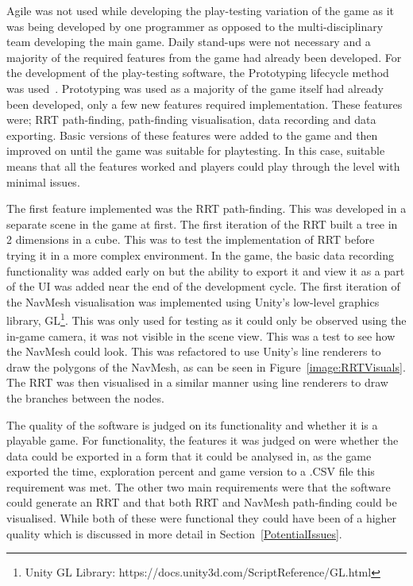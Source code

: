 \documentclass[journal]{IEEEtran}
\begin{document}
	Agile was not used while developing the play-testing variation of the game as it was being developed by one programmer as opposed to the multi-disciplinary team developing the main game. Daily stand-ups were not necessary and a majority of the required features from the game had already been developed. 
	For the development of the play-testing software, the Prototyping lifecycle method was used~\cite{isaias2015}. Prototyping was used as a majority of the game itself had already been developed, only a few new features required implementation. These features were; RRT path-finding, path-finding visualisation, data recording and data exporting. Basic versions of these features were added to the game and then improved on until the game was suitable for playtesting. In this case, suitable means that all the features worked and players could play through the level with minimal issues.  
	
	The first feature implemented was the RRT path-finding. This was developed in a separate scene in the game at first. The first iteration of the RRT built a tree in 2 dimensions in a cube. This was to test the implementation of RRT before trying it in a more complex environment.  In the game, the basic data recording functionality was added early on but the ability to export it and view it as a part of the UI was added near the end of the development cycle. The first iteration of the NavMesh visualisation was implemented using Unity's low-level graphics library, GL\footnote[5]{Unity GL Library: https://docs.unity3d.com/ScriptReference/GL.html}. This was only used for testing as it could only be observed using the in-game camera,  it was not visible in the scene view. This was a test to see how the NavMesh could look. This was refactored to use Unity's line renderers to draw the polygons of the NavMesh, as can be seen in Figure~\ref{image:RRTVisuals}. The RRT was then visualised in a similar manner using line renderers to draw the branches between the nodes.   
	
	The quality of the software is judged on its functionality and whether it is a playable game. For functionality, the features it was judged on were whether the data could be exported in a form that it could be analysed in, as the game exported the time, exploration percent and game version to a .CSV file this requirement was met. The other two main requirements were that the software could generate an RRT and that both RRT and NavMesh path-finding could be visualised. While both of these were functional they could have been of a higher quality which is discussed in more detail in Section~\ref{PotentialIssues}.
	
\end{document}
